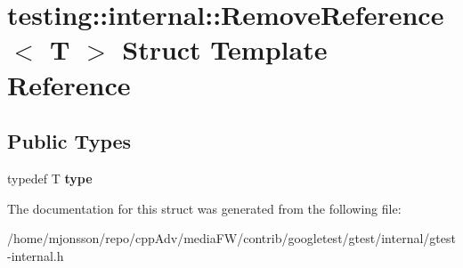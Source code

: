 \hypertarget{structtesting_1_1internal_1_1RemoveReference}{}\section{testing\+:\+:internal\+:\+:Remove\+Reference$<$ T $>$ Struct Template Reference}
\label{structtesting_1_1internal_1_1RemoveReference}
\subsection*{Public Types}
\begin{DoxyCompactItemize}
\item 
\mbox{\label{structtesting_1_1internal_1_1RemoveReference_a9ca4f6499579225f7986b789ee4b2895}} 
typedef T {\bfseries type}
\end{DoxyCompactItemize}


The documentation for this struct was generated from the following file\+:\begin{DoxyCompactItemize}
\item 
/home/mjonsson/repo/cpp\+Adv/media\+F\+W/contrib/googletest/gtest/internal/gtest-\/internal.\+h\end{DoxyCompactItemize}
